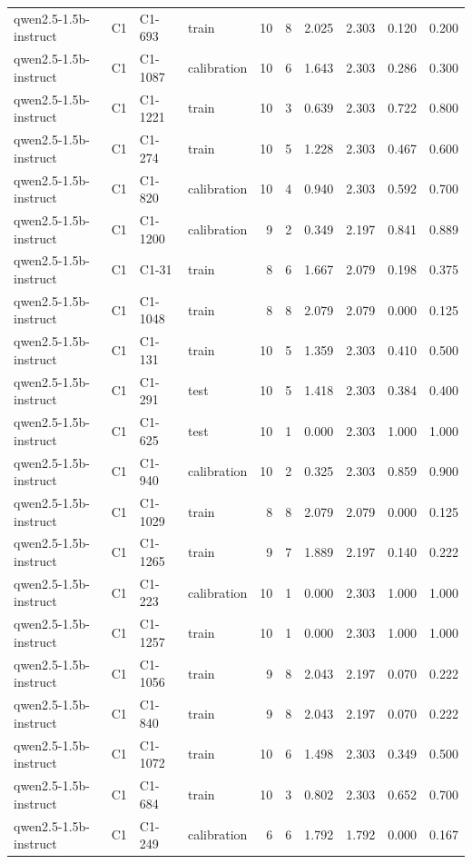 \begin{table}
\begin{tabular}{llllrrrrrr}
qwen2.5-1.5b-instruct & C1 & C1-693 & train & 10 & 8 & 2.025 & 2.303 & 0.120 & 0.200 \\
qwen2.5-1.5b-instruct & C1 & C1-1087 & calibration & 10 & 6 & 1.643 & 2.303 & 0.286 & 0.300 \\
qwen2.5-1.5b-instruct & C1 & C1-1221 & train & 10 & 3 & 0.639 & 2.303 & 0.722 & 0.800 \\
qwen2.5-1.5b-instruct & C1 & C1-274 & train & 10 & 5 & 1.228 & 2.303 & 0.467 & 0.600 \\
qwen2.5-1.5b-instruct & C1 & C1-820 & calibration & 10 & 4 & 0.940 & 2.303 & 0.592 & 0.700 \\
qwen2.5-1.5b-instruct & C1 & C1-1200 & calibration & 9 & 2 & 0.349 & 2.197 & 0.841 & 0.889 \\
qwen2.5-1.5b-instruct & C1 & C1-31 & train & 8 & 6 & 1.667 & 2.079 & 0.198 & 0.375 \\
qwen2.5-1.5b-instruct & C1 & C1-1048 & train & 8 & 8 & 2.079 & 2.079 & 0.000 & 0.125 \\
qwen2.5-1.5b-instruct & C1 & C1-131 & train & 10 & 5 & 1.359 & 2.303 & 0.410 & 0.500 \\
qwen2.5-1.5b-instruct & C1 & C1-291 & test & 10 & 5 & 1.418 & 2.303 & 0.384 & 0.400 \\
qwen2.5-1.5b-instruct & C1 & C1-625 & test & 10 & 1 & 0.000 & 2.303 & 1.000 & 1.000 \\
qwen2.5-1.5b-instruct & C1 & C1-940 & calibration & 10 & 2 & 0.325 & 2.303 & 0.859 & 0.900 \\
qwen2.5-1.5b-instruct & C1 & C1-1029 & train & 8 & 8 & 2.079 & 2.079 & 0.000 & 0.125 \\
qwen2.5-1.5b-instruct & C1 & C1-1265 & train & 9 & 7 & 1.889 & 2.197 & 0.140 & 0.222 \\
qwen2.5-1.5b-instruct & C1 & C1-223 & calibration & 10 & 1 & 0.000 & 2.303 & 1.000 & 1.000 \\
qwen2.5-1.5b-instruct & C1 & C1-1257 & train & 10 & 1 & 0.000 & 2.303 & 1.000 & 1.000 \\
qwen2.5-1.5b-instruct & C1 & C1-1056 & train & 9 & 8 & 2.043 & 2.197 & 0.070 & 0.222 \\
qwen2.5-1.5b-instruct & C1 & C1-840 & train & 9 & 8 & 2.043 & 2.197 & 0.070 & 0.222 \\
qwen2.5-1.5b-instruct & C1 & C1-1072 & train & 10 & 6 & 1.498 & 2.303 & 0.349 & 0.500 \\
qwen2.5-1.5b-instruct & C1 & C1-684 & train & 10 & 3 & 0.802 & 2.303 & 0.652 & 0.700 \\
qwen2.5-1.5b-instruct & C1 & C1-249 & calibration & 6 & 6 & 1.792 & 1.792 & 0.000 & 0.167 \\

\end{tabular}
\end{table}
